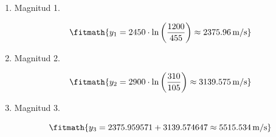 \begin{enumerate}

\item Magnitud 1.

\[\fitmath{y_{1}=2450\cdot \ln\left(\frac{1200}{455}\right)\approx 2375.96\,\mathrm{m/s}}\]

\item Magnitud 2.

\[\fitmath{y_{2}=2900\cdot \ln\left(\frac{310}{105}\right)\approx 3139.575\,\mathrm{m/s}}\]

\item Magnitud 3.

\[\fitmath{y_{3}=2375.959571+3139.574647\approx 5515.534\,\mathrm{m/s}}\]

\end{enumerate}

